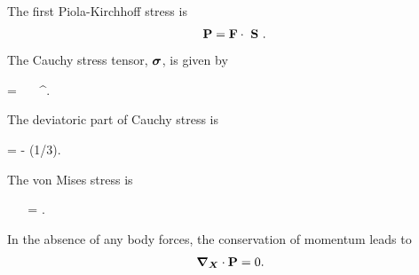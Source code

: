 The first Piola-Kirchhoff stress is
\begin{gather}
    \PK = \F \cdot  \PKS  \label{eq:P_tensor}.
\end{gather}
The Cauchy stress tensor, $\bm{\sigma}$, is given by 
\begin{nonumbereq}\CS =  \F \cdot  \PKS  \cdot  \F^\T.
\end{nonumbereq} The deviatoric part of Cauchy stress is \begin{nonumbereq}\DCS = \CS - (1/3)\tr{\CS}\I.
\end{nonumbereq}
The von Mises stress is 
\begin{nonumbereq}
    \sigmaeff = . 
\end{nonumbereq}

In the absence of any body forces, the conservation of momentum leads to 
\begin{gather}
\bm{\nabla}_{\bm{X}} \cdot \mathbf{P} = 0.
\end{gather}

